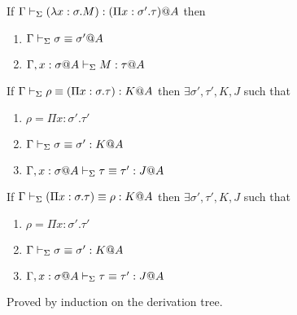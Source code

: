 \begin{lemma}
	If $\Gamma \vdash_\Sigma (\lambda x:\sigma.M) : (\Pi x:\sigma'.\tau)@A$ then
	\begin{enumerate}
		\item $\Gamma \vdash_\Sigma \sigma \equiv \sigma'@A$
		\item $\G ,x:\sigma@A\V M:\tau@A$
	\end{enumerate}
	\item If $\Gamma \vdash_\Sigma \rho \equiv (\Pi x:\sigma.\tau) : K @A$ then $\exists \sigma', \tau', K, J$ such that
	\begin{enumerate}
		\item $\rho = \Pi x:\sigma'.\tau'$
		\item $\Gamma \vdash_\Sigma \sigma \equiv \sigma' : K @A$
		\item $\G, x:\sigma@A\V \tau \E \tau' : J @A$
	\end{enumerate}
	\item If $\Gamma \vdash_\Sigma (\Pi x:\sigma.\tau) \equiv \rho : K @A$ then $\exists \sigma', \tau', K, J$ such that
	\begin{enumerate}
		\item $\rho = \Pi x:\sigma'.\tau'$
		\item $\Gamma \vdash_\Sigma \sigma \equiv \sigma' : K @A$
		\item $\G, x:\sigma@A\V \tau \E \tau' : J @A$
	\end{enumerate}
\end{lemma}

Proved by induction on the derivation tree.

